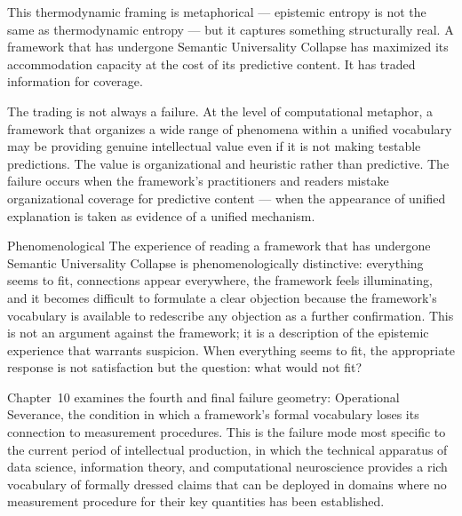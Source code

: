 This thermodynamic framing is metaphorical --- epistemic
entropy is not the same as thermodynamic entropy --- but
it captures something structurally real. A framework that
has undergone Semantic Universality Collapse has maximized
its accommodation capacity at the cost of its predictive
content. It has traded information for coverage.

The trading is not always a failure. At the level of
computational metaphor, a framework that organizes a wide
range of phenomena within a unified vocabulary may be
providing genuine intellectual value even if it is not
making testable predictions. The value is organizational
and heuristic rather than predictive. The failure occurs
when the framework's practitioners and readers mistake
organizational coverage for predictive content --- when
the appearance of unified explanation is taken as evidence
of a unified mechanism.

\begin{epistemicstatus}{Phenomenological}
The experience of reading a framework that has undergone
Semantic Universality Collapse is phenomenologically
distinctive: everything seems to fit, connections appear
everywhere, the framework feels illuminating, and it
becomes difficult to formulate a clear objection because
the framework's vocabulary is available to redescribe
any objection as a further confirmation. This is not an
argument against the framework; it is a description of
the epistemic experience that warrants suspicion. When
everything seems to fit, the appropriate response is
not satisfaction but the question: what would not fit?
\end{epistemicstatus}

\medskip

Chapter~10 examines the fourth and final failure geometry:
Operational Severance, the condition in which a framework's
formal vocabulary loses its connection to measurement
procedures. This is the failure mode most specific to
the current period of intellectual production, in which
the technical apparatus of data science, information
theory, and computational neuroscience provides a rich
vocabulary of formally dressed claims that can be deployed
in domains where no measurement procedure for their
key quantities has been established.
